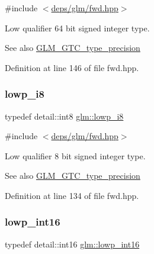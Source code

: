 {\ttfamily \#include $<$\hyperlink{fwd_8hpp}{deps/glm/fwd.\+hpp}$>$}

Low qualifier 64 bit signed integer type. \begin{DoxySeeAlso}{See also}
\hyperlink{group__gtc__type__precision}{G\+L\+M\+\_\+\+G\+T\+C\+\_\+type\+\_\+precision} 
\end{DoxySeeAlso}


Definition at line 146 of file fwd.\+hpp.

\mbox{\label{group__gtc__type__precision_gaa2e13ee29c90f75658beed6082541097}} 
\subsubsection{\texorpdfstring{lowp\+\_\+i8}{lowp\_i8}}
{\footnotesize\ttfamily typedef detail\+::int8 \hyperlink{group__gtc__type__precision_gaa2e13ee29c90f75658beed6082541097}{glm\+::lowp\+\_\+i8}}



{\ttfamily \#include $<$\hyperlink{fwd_8hpp}{deps/glm/fwd.\+hpp}$>$}

Low qualifier 8 bit signed integer type. \begin{DoxySeeAlso}{See also}
\hyperlink{group__gtc__type__precision}{G\+L\+M\+\_\+\+G\+T\+C\+\_\+type\+\_\+precision} 
\end{DoxySeeAlso}


Definition at line 134 of file fwd.\+hpp.

\mbox{\label{group__gtc__type__precision_ga71fc0c399fa4780507748b643733f153}} 
\subsubsection{\texorpdfstring{lowp\+\_\+int16}{lowp\_int16}}
{\footnotesize\ttfamily typedef detail\+::int16 \hyperlink{group__gtc__type__precision_ga71fc0c399fa4780507748b643733f153}{glm\+::lowp\+\_\+int16}}



